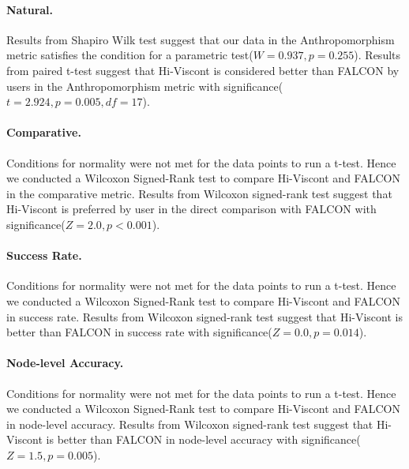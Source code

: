 \paragraph{Natural.}Results from Shapiro Wilk test suggest that our data in the Anthropomorphism metric satisfies the condition for a parametric test($W=0.937, p=0.255$). Results from paired t-test suggest that Hi-Viscont is considered better than FALCON by users in the Anthropomorphism metric with significance($t=2.924, p=0.005, df=17$).
\paragraph{Comparative.}Conditions for normality were not met for the data points to run a t-test. Hence we conducted a Wilcoxon Signed-Rank test to compare Hi-Viscont and FALCON in the comparative metric. Results from Wilcoxon signed-rank test suggest that Hi-Viscont is preferred by user in the direct comparison with FALCON with significance($Z=2.0, p<0.001$).
\paragraph{Success Rate.}Conditions for normality were not met for the data points to run a t-test. Hence we conducted a Wilcoxon Signed-Rank test to compare Hi-Viscont and FALCON in success rate. Results from Wilcoxon signed-rank test suggest that Hi-Viscont is better than FALCON in success rate with significance($Z=0.0, p=0.014$).
\paragraph{Node-level Accuracy.}Conditions for normality were not met for the data points to run a t-test. Hence we conducted a Wilcoxon Signed-Rank test to compare Hi-Viscont and FALCON in node-level accuracy. Results from Wilcoxon signed-rank test suggest that Hi-Viscont is better than FALCON in node-level accuracy with significance($Z=1.5, p=0.005$).


